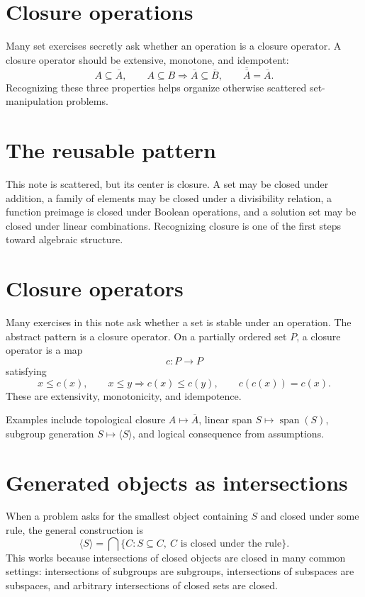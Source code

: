 \section{Closure operations}

Many set exercises secretly ask whether an operation is a closure operator.  A closure operator should be extensive, monotone, and idempotent:
\[
  A\subseteq \overline A,\qquad
  A\subseteq B\Rightarrow \overline A\subseteq \overline B,\qquad
  \overline{\overline A}=\overline A.
\]
Recognizing these three properties helps organize otherwise scattered set-manipulation problems.

\section{The reusable pattern}

This note is scattered, but its center is closure.  A set may be closed under addition, a family of elements may be closed under a divisibility relation, a function preimage is closed under Boolean operations, and a solution set may be closed under linear combinations.  Recognizing closure is one of the first steps toward algebraic structure.

\section{Closure operators}

Many exercises in this note ask whether a set is stable under an operation.  The abstract pattern is a closure operator.  On a partially ordered set \(P\), a closure operator is a map
\[
  c:P\to P
\]
satisfying
\[
  x\le c(x),\qquad
  x\le y\Rightarrow c(x)\le c(y),\qquad
  c(c(x))=c(x).
\]
These are extensivity, monotonicity, and idempotence.

Examples include topological closure \(A\mapsto\overline A\), linear span \(S\mapsto\operatorname{span}(S)\), subgroup generation \(S\mapsto\langle S\rangle\), and logical consequence from assumptions.

\section{Generated objects as intersections}

When a problem asks for the smallest object containing \(S\) and closed under some rule, the general construction is
\[
  \langle S\rangle=\bigcap\{C:S\subseteq C,\ C\text{ is closed under the rule}\}.
\]
This works because intersections of closed objects are closed in many common settings: intersections of subgroups are subgroups, intersections of subspaces are subspaces, and arbitrary intersections of closed sets are closed.

